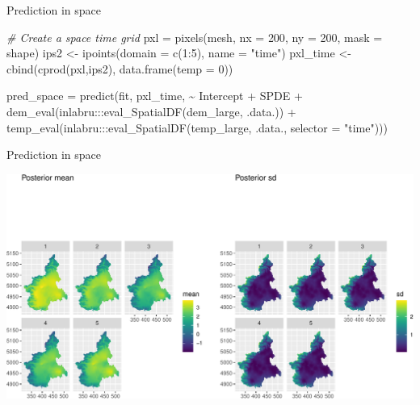 \documentclass[
  ignorenonframetext,
]{beamer}
\newenvironment{Shaded}{\begin{snugshade}}{\end{snugshade}}
\newcommand{\AttributeTok}[1]{\textcolor[rgb]{0.77,0.63,0.00}{#1}}
\newcommand{\CommentTok}[1]{\textcolor[rgb]{0.56,0.35,0.01}{\textit{#1}}}
\newcommand{\DecValTok}[1]{\textcolor[rgb]{0.00,0.00,0.81}{#1}}
\newcommand{\FunctionTok}[1]{\textcolor[rgb]{0.00,0.00,0.00}{#1}}
\newcommand{\NormalTok}[1]{#1}
\newcommand{\OtherTok}[1]{\textcolor[rgb]{0.56,0.35,0.01}{#1}}
\newcommand{\SpecialCharTok}[1]{\textcolor[rgb]{0.00,0.00,0.00}{#1}}
\newcommand{\StringTok}[1]{\textcolor[rgb]{0.31,0.60,0.02}{#1}}
\begin{document}
\begin{frame}[fragile]{Prediction in space}
\tiny

\begin{Shaded}
\begin{Highlighting}[]
\CommentTok{\# Create a space time grid }
\NormalTok{pxl }\OtherTok{=} \FunctionTok{pixels}\NormalTok{(mesh, }\AttributeTok{nx =} \DecValTok{200}\NormalTok{, }\AttributeTok{ny =} \DecValTok{200}\NormalTok{, }\AttributeTok{mask =}\NormalTok{ shape)}
\NormalTok{ips2 }\OtherTok{\textless{}{-}} \FunctionTok{ipoints}\NormalTok{(}\AttributeTok{domain =} \FunctionTok{c}\NormalTok{(}\DecValTok{1}\SpecialCharTok{:}\DecValTok{5}\NormalTok{), }\AttributeTok{name =} \StringTok{"time"}\NormalTok{)}
\NormalTok{pxl\_time }\OtherTok{\textless{}{-}} \FunctionTok{cbind}\NormalTok{(}\FunctionTok{cprod}\NormalTok{(pxl,ips2), }\FunctionTok{data.frame}\NormalTok{(}\AttributeTok{temp =} \DecValTok{0}\NormalTok{))}

\NormalTok{pred\_space }\OtherTok{=} \FunctionTok{predict}\NormalTok{(fit, pxl\_time, }
                      \SpecialCharTok{\textasciitilde{}}\NormalTok{ Intercept }\SpecialCharTok{+}\NormalTok{ SPDE }\SpecialCharTok{+}
                       \FunctionTok{dem\_eval}\NormalTok{(inlabru}\SpecialCharTok{:::}\FunctionTok{eval\_SpatialDF}\NormalTok{(dem\_large,}
\NormalTok{                                                         .data.)) }\SpecialCharTok{+}
                       \FunctionTok{temp\_eval}\NormalTok{(inlabru}\SpecialCharTok{:::}\FunctionTok{eval\_SpatialDF}\NormalTok{(temp\_large,}
\NormalTok{                                                          .data.,}
                                                          \AttributeTok{selector =} \StringTok{"time"}\NormalTok{)))}
\end{Highlighting}
\end{Shaded}

\normalsize
\end{frame}

\begin{frame}{Prediction in space}
\protect\hypertarget{prediction-in-space-1}{}
\begin{center}\includegraphics[width=0.9\linewidth]{Part3_Spatial_files/figure-beamer/unnamed-chunk-37-1} \end{center}
\end{frame}
\end{document}
